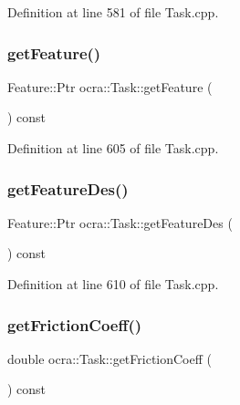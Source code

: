 Definition at line 581 of file Task.\+cpp.

\hypertarget{classocra_1_1Task_a18b2e326e85a6bbf8ff4e22be7a413da}{}\label{classocra_1_1Task_a18b2e326e85a6bbf8ff4e22be7a413da} 
\subsubsection{\texorpdfstring{get\+Feature()}{getFeature()}}
{\footnotesize\ttfamily Feature\+::\+Ptr ocra\+::\+Task\+::get\+Feature (\begin{DoxyParamCaption}{ }\end{DoxyParamCaption}) const\hspace{0.3cm}{\ttfamily [protected]}}



Definition at line 605 of file Task.\+cpp.

\hypertarget{classocra_1_1Task_a6f723dae3dfd819844638adca4ac818f}{}\label{classocra_1_1Task_a6f723dae3dfd819844638adca4ac818f} 
\subsubsection{\texorpdfstring{get\+Feature\+Des()}{getFeatureDes()}}
{\footnotesize\ttfamily Feature\+::\+Ptr ocra\+::\+Task\+::get\+Feature\+Des (\begin{DoxyParamCaption}{ }\end{DoxyParamCaption}) const\hspace{0.3cm}{\ttfamily [protected]}}



Definition at line 610 of file Task.\+cpp.

\hypertarget{classocra_1_1Task_a2f4d01238f3216ad6d837de99fb5a09b}{}\label{classocra_1_1Task_a2f4d01238f3216ad6d837de99fb5a09b} 
\subsubsection{\texorpdfstring{get\+Friction\+Coeff()}{getFrictionCoeff()}}
{\footnotesize\ttfamily double ocra\+::\+Task\+::get\+Friction\+Coeff (\begin{DoxyParamCaption}{ }\end{DoxyParamCaption}) const}



